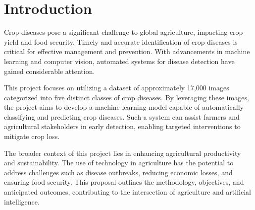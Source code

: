 \newpage
\section{Introduction}
Crop diseases pose a significant challenge to global agriculture, impacting crop yield and food security. Timely and accurate identification of crop diseases is critical for effective management and prevention. With advancements in machine learning and computer vision, automated systems for disease detection have gained considerable attention.

This project focuses on utilizing a dataset of approximately 17,000 images categorized into five distinct classes of crop diseases. By leveraging these images, the project aims to develop a machine learning model capable of automatically classifying and predicting crop diseases. Such a system can assist farmers and agricultural stakeholders in early detection, enabling targeted interventions to mitigate crop loss.

The broader context of this project lies in enhancing agricultural productivity and sustainability. The use of technology in agriculture has the potential to address challenges such as disease outbreaks, reducing economic losses, and ensuring food security. This proposal outlines the methodology, objectives, and anticipated outcomes, contributing to the intersection of agriculture and artificial intelligence.
